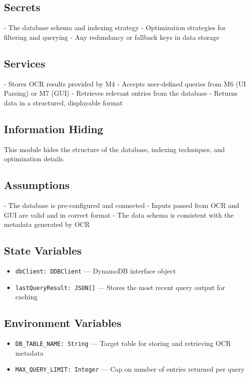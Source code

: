 \documentclass[12pt, titlepage]{article}
\begin{document}
\subsection*{Secrets}
- The database schema and indexing strategy  
- Optimization strategies for filtering and querying  
- Any redundancy or fallback keys in data storage

\subsection*{Services}
- Stores OCR results provided by M4  
- Accepts user-defined queries from M6 (UI Parsing) or M7 (GUI)  
- Retrieves relevant entries from the database  
- Returns data in a structured, displayable format

\subsection*{Information Hiding}
This module hides the structure of the database, indexing techniques, and optimization details.

\subsection*{Assumptions}
- The database is pre-configured and connected  
- Inputs passed from OCR and GUI are valid and in correct format  
- The data schema is consistent with the metadata generated by OCR

\subsection*{State Variables}
\begin{itemize}
  \item \texttt{dbClient: DDBClient} — DynamoDB interface object  
  \item \texttt{lastQueryResult: JSON[]} — Stores the most recent query output for caching
\end{itemize}

\subsection*{Environment Variables}
\begin{itemize}
  \item \texttt{DB\_TABLE\_NAME: String} — Target table for storing and retrieving OCR metadata  
  \item \texttt{MAX\_QUERY\_LIMIT: Integer} — Cap on number of entries returned per query
\end{itemize}
\end{document}

